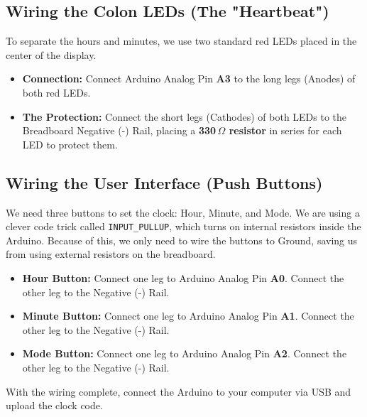 \documentclass[11pt,a4paper]{article}
\begin{document}
\subsection*{Wiring the Colon LEDs (The "Heartbeat")}
To separate the hours and minutes, we use two standard red LEDs placed in the center of the display.
\begin{itemize}
    \item \textbf{Connection:} Connect Arduino Analog Pin \textbf{A3} to the long legs (Anodes) of both red LEDs. 
    \item \textbf{The Protection:} Connect the short legs (Cathodes) of both LEDs to the Breadboard Negative (-) Rail, placing a \textbf{330\,$\Omega$ resistor} in series for each LED to protect them.
\end{itemize}

\subsection*{Wiring the User Interface (Push Buttons)}
We need three buttons to set the clock: Hour, Minute, and Mode. We are using a clever code trick called \texttt{INPUT\_PULLUP}, which turns on internal resistors inside the Arduino. Because of this, we only need to wire the buttons to Ground, saving us from using external resistors on the breadboard.
\begin{itemize}
    \item \textbf{Hour Button:} Connect one leg to Arduino Analog Pin \textbf{A0}. Connect the other leg to the Negative (-) Rail.
    \item \textbf{Minute Button:} Connect one leg to Arduino Analog Pin \textbf{A1}. Connect the other leg to the Negative (-) Rail.
    \item \textbf{Mode Button:} Connect one leg to Arduino Analog Pin \textbf{A2}. Connect the other leg to the Negative (-) Rail.
\end{itemize}
With the wiring complete, connect the Arduino to your computer via USB and upload the clock code.
\end{document}
